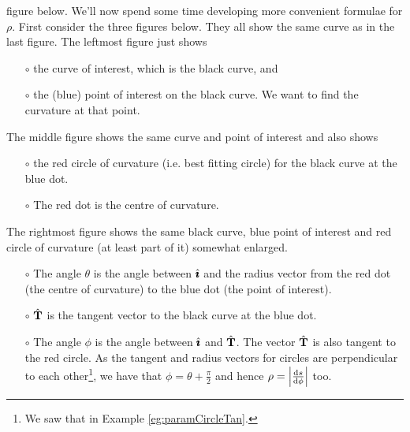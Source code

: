 figure below.
We'll now spend some time developing more convenient formulae for $\rho$.
First consider the three figures below. They all show the same curve
as in the last figure. The leftmost figure just shows
\begin{itemize}\itemsep1pt \parskip0pt  %
\item[$\circ$]
the curve of interest, which is the black curve, and
\item[$\circ$]
the (blue) point of interest on the black curve. We want to find the curvature
at that point.
\end{itemize}
The middle figure shows the same curve and point of interest and also 
shows  
\begin{itemize}\itemsep1pt \parskip0pt  %
\item[$\circ$]
the red circle of curvature (i.e. best fitting circle) for the black curve 
at the blue dot.
\item[$\circ$]
The red dot is the centre of curvature.
\end{itemize}
The rightmost figure shows the same black curve, blue point of interest
and red circle of curvature (at least part of it) somewhat enlarged.
\begin{itemize}\itemsep1pt \parskip0pt  %
\item[$\circ$]
The angle $\theta$ is the angle between $\hat{\pmb{\imath}}$ and the radius
vector from the red dot (the centre of curvature) to the blue dot
(the point of interest). 
\item[$\circ$] 
$\hat{\mathbf{T}}$ is the tangent vector to the black curve at the blue
dot. 
\item[$\circ$]  
The angle $\phi$ is the angle between $\hat{\pmb{\imath}}$ and $\hat{\mathbf{T}}$. 
The vector $\hat{\mathbf{T}}$ is also tangent to the red circle. As 
the tangent and radius vectors for circles are perpendicular to 
each other\footnote{We saw that in Example \ref{eg:paramCircleTan}.}, 
we have that $\phi=\theta+\frac{\pi}{2}$ and hence 
$\rho = \Big|\diff{s}{\phi}\Big|$ too.
\end{itemize}
